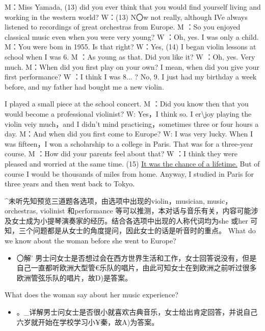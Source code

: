 \documentclass[UTF8,11pt]{ctexart}
\begin{document}
M：Miss Yamada, (13) did you ever think that you would find yourself living and working in the western world? W：(13) N〇w not really, although IVe always listened to recordings of great orchestras from Europe. M ：So you enjoyed classical music even when you were very young? W ：Oh, yes. I was only a child. M：You were bom in 1955. Is that right? W：Yes, (14) I began violin lessons at school when I was 6. M ：As young as that. Did you like it? W ：Oh, yes. Very much. M：When did you first play on your own? I mean, when did you give your first performance? W ：I think I was 8... ? No, 9. I just had my birthday a week before, and my father had bought me a new violin.


I played a small piece at the school concert. M ：Did you know then that you would become a professional violinist? W: Yes，I think so. I er\textbackslash{}joy playing the violin veiy much，and I didn’t mind practicing，sometimes three or four hours a day. M：And when did you first come to Europe? W: I was very lucky. When I was fifteen，I won a scholarship to a college in Paris. That was for a three-year course. M ：How did your parents feel about that? W ：I think they were pleased and worried at the same time. (15) \uline{It was the chance of a lifetime.} But of course I would be thousands of miles from home. Anyway, I studied in Paris for three years and then went back to Tokyo.


\textasciicircum{}未听先知预览三道题各选项，由选项中出现的violin，musician, music，orchestras, violinist 和performance 等可以推测，本对话与音乐有关，内容可能涉及女士成为小提琴演奏家的经历。结合各选项中出现的人称代词均为she 或her 可知，三个问题都是从女士的角度提问，因此女士的话是听音时的重点。 What do we know about the woman before she went to Europe?


\begin{itemize}[leftmargin=2em,itemsep=.2em,topsep=.4em]\item[D.] 〇解' 男士问女士是否想过会在西方世界生活和工作，女士回答说没有，但是自己一直都听欧洲大型管€乐队的唱片，由此可知女士在到欧洲之前听过很多欧洲管弦乐队的唱片，故D)是答案。
\end{itemize}

What does the woman say about her music experience?


\begin{itemize}[leftmargin=2em,itemsep=.2em,topsep=.4em]\item[A.] 。\_详解男士问女士是否很小就喜欢古典音乐，女士给出肯定回答，并说自己六岁就开始在学校学习小¥秦，故A)为答案。
\end{itemize}
\end{document}
